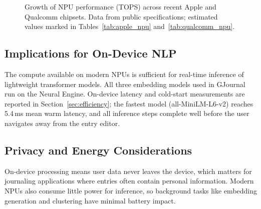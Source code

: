\begin{figure}[h]
\centering
{}
\caption{Growth of NPU performance (TOPS) across recent Apple and Qualcomm chipsets. Data from public specifications; estimated values marked in Tables~\ref{tab:apple_npu} and~\ref{tab:qualcomm_npu}.}
\label{fig:npu_tops}
\end{figure}

\subsection{Implications for On-Device NLP}

The compute available on modern NPUs is sufficient for real-time inference of lightweight transformer models. All three embedding models used in GJournal run on the Neural Engine. On-device latency and cold-start measurements are reported in Section~\ref{sec:efficiency}; the fastest model (all-MiniLM-L6-v2) reaches 5.4\,ms mean warm latency, and all inference steps complete well before the user navigates away from the entry editor.

\subsection{Privacy and Energy Considerations}

On-device processing means user data never leaves the device, which matters for journaling applications where entries often contain personal information. Modern NPUs also consume little power for inference, so background tasks like embedding generation and clustering have minimal battery impact.

